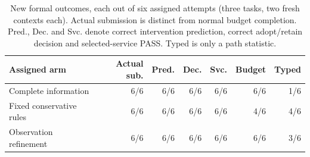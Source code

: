 \begin{table}[tbp]
\centering\small
\setlength{\tabcolsep}{4.5pt}
\caption{New formal outcomes, each out of six assigned attempts (three tasks, two fresh contexts each). Actual submission is distinct from normal budget completion. Pred., Dec. and Svc. denote correct intervention prediction, correct adopt/retain decision and selected-service PASS. Typed is only a path statistic.}
\label{tab:abc-outcomes}
\begin{tabular}{lrrrrrr}
\toprule
Assigned arm & Actual sub. & Pred. & Dec. & Svc. & Budget & Typed \\
\midrule
Complete information & 6/6 & 6/6 & 6/6 & 6/6 & 6/6 & 1/6 \\
Fixed conservative rules & 6/6 & 6/6 & 6/6 & 6/6 & 4/6 & 4/6 \\
Observation refinement & 6/6 & 6/6 & 6/6 & 6/6 & 6/6 & 3/6 \\
\bottomrule
\end{tabular}
\end{table}
